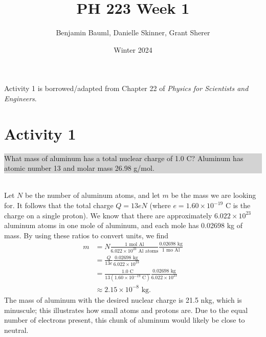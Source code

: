 \documentclass[]{article}
\title{PH 223 Week 1}
\author{Benjamin Bauml, Danielle Skinner, Grant Sherer}
\date{Winter 2024}
\newcommand{\excerpt}[1]{\colorbox{lightgray}{\parbox{14.8cm}{#1}} \\}
\begin{document}
\maketitle

\begin{center}
Activity 1 is borrowed/adapted from Chapter 22 of \textit{Physics for Scientists and Engineers}.
\end{center}
\section*{Activity 1}
\excerpt{
What mass of aluminum has a total nuclear charge of 1.0 C? Aluminum has atomic number 13 and molar mass 26.98 g/mol.
}
Let $ N $ be the number of aluminum atoms, and let $ m $ be the mass we are looking for. It follows that the total charge $ Q = 13eN $ (where $ e = 1.60\times10^{-19} $ C is the charge on a single proton). We know that there are approximately $ 6.022\times10^{23} $ aluminum atoms in one mole of aluminum, and each mole has 0.02698 kg of mass. By using these ratios to convert units, we find
\[
\begin{split}
	m & = N \frac{1\text{ mol Al}}{6.022\times10^{23}\text{ Al atoms}} \frac{0.02698\text{ kg}}{1\text{ mo Al}} \\
	& = \frac{Q}{13e} \frac{0.02698\text{ kg}}{6.022\times10^{23}} \\
	& = \frac{1.0\text{ C}}{13(1.60\times10^{-19}\text{ C})} \frac{0.02698\text{ kg}}{6.022\times10^{23}} \\
	& \approx 2.15\times10^{-8}\text{ kg}.
\end{split}
\]
The mass of aluminum with the desired nuclear charge is 21.5 nkg, which is minuscule; this illustrates how small atoms and protons are. Due to the equal number of electrons present, this chunk of aluminum would likely be close to neutral.
\end{document}

